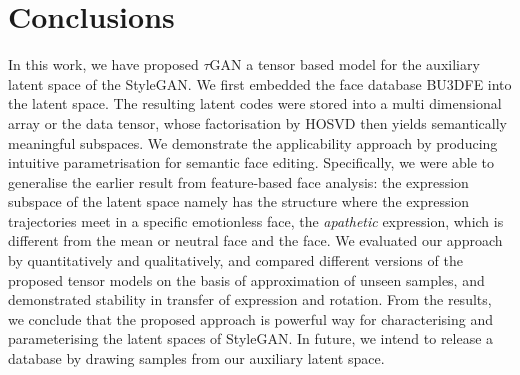 \section{Conclusions}
\label{sec:conclusion}



In this work, we have proposed $\tau$GAN a tensor based model for the auxiliary latent space of the StyleGAN. 
We first embedded the face database BU3DFE into the latent space. The resulting latent codes were stored into a multi dimensional  array or the data tensor, whose factorisation by HOSVD then yields semantically meaningful subspaces. We demonstrate the applicability approach by producing intuitive parametrisation for semantic face editing. 
%
Specifically, we were able to generalise the earlier result \cite{apathy} from feature-based face analysis:  %
the expression subspace of the latent space namely has the structure where the expression trajectories meet in 
a specific emotionless face, the \emph{apathetic} expression, which is different from the mean or neutral face and the face. 
%
We evaluated our approach by quantitatively and qualitatively, and compared different versions of the proposed tensor models on the basis of approximation of unseen samples, and demonstrated stability in transfer of expression and rotation. From the results, we conclude that the proposed approach is powerful way for characterising and parameterising the latent spaces of StyleGAN.
%
In future, we intend to release a database by drawing samples from our auxiliary latent space. 




